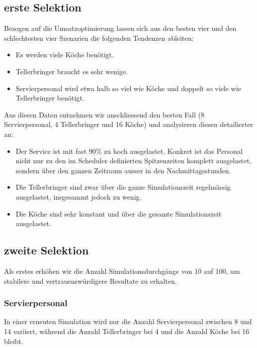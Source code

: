 \documentclass[ngerman,a4paper,12pt]{scrreprt}
\begin{document}
		\subsection{erste Selektion}
			Bezogen auf die Umsatzoptimierung lassen sich aus den besten vier und den schlechtesten vier Szenarien die folgenden Tendenzen ableiten:
			\begin{itemize}
				\item Es werden viele Köche benötigt. 
				\item Tellerbringer braucht es sehr wenige.
				\item Servierpersonal wird etwa halb so viel wie Köche und doppelt so viele wie Tellerbringer benötigt.
			\end{itemize}
		
			Aus diesen Daten entnehmen wir anschliessend den besten Fall (8 Servierpersonal, 4 Tellerbringer und 16 Köche) und analysieren diesen detailierter an:
		
			\begin{itemize}
				\item Der Service ist mit fast 90\% zu hoch ausgelastet. Konkret ist das Personal nicht nur zu den im Scheduler definierten Spitzenzeiten komplett ausgelastet, sondern über den ganzen Zeitraum ausser in den Nachmittagsstunden. 				\item Die Tellerbringer sind zwar über die ganze Simulationszeit regelmässig ausgelastet, insgesammt jedoch zu wenig.
				\item Die Köche sind sehr konstant und über die gesamte Simulationszeit ausgelastet.
			\end{itemize}
			
			
		\subsection{zweite Selektion}
			Als erstes erhöhen wir die Anzahl Simulationsdurchgänge von 10 auf 100, um stabilere und vertrauenswürdigere Resultate zu erhalten.
			
			\subsubsection{Servierpersonal}
				In einer erneuten Simulation wird nur die Anzahl Servierpersonal zwischen 8 und 14 variiert, während die Anzahl Tellerbringer bei 4 und die Anzahl Köche bei 16 bleibt.
				
\end{document}
